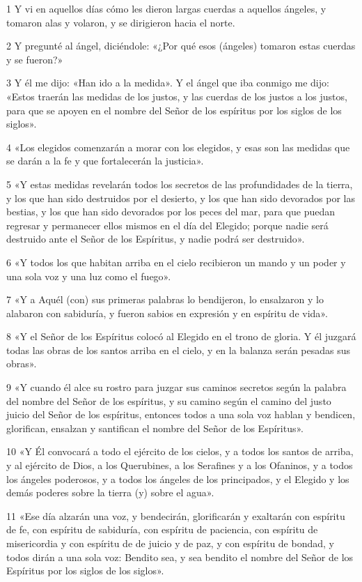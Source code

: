 \par 1 Y vi en aquellos días cómo les dieron largas cuerdas a aquellos ángeles, y tomaron alas y volaron, y se dirigieron hacia el norte.
\par 2 Y pregunté al ángel, diciéndole: «¿Por qué esos (ángeles) tomaron estas cuerdas y se fueron?»
\par 3 Y él me dijo: «Han ido a la medida». Y el ángel que iba conmigo me dijo: «Estos traerán las medidas de los justos, y las cuerdas de los justos a los justos, para que se apoyen en el nombre del Señor de los espíritus por los siglos de los siglos».
\par 4 «Los elegidos comenzarán a morar con los elegidos, y esas son las medidas que se darán a la fe y que fortalecerán la justicia».
\par 5 «Y estas medidas revelarán todos los secretos de las profundidades de la tierra, y los que han sido destruidos por el desierto, y los que han sido devorados por las bestias, y los que han sido devorados por los peces del mar, para que puedan regresar y permanecer ellos mismos en el día del Elegido; porque nadie será destruido ante el Señor de los Espíritus, y nadie podrá ser destruido».
\par 6 «Y todos los que habitan arriba en el cielo recibieron un mando y un poder y una sola voz y una luz como el fuego».
\par 7 «Y a Aquél (con) sus primeras palabras lo bendijeron, lo ensalzaron y lo alabaron con sabiduría, y fueron sabios en expresión y en espíritu de vida».
\par 8 «Y el Señor de los Espíritus colocó al Elegido en el trono de gloria. Y él juzgará todas las obras de los santos arriba en el cielo, y en la balanza serán pesadas sus obras».
\par 9 «Y cuando él alce su rostro para juzgar sus caminos secretos según la palabra del nombre del Señor de los espíritus, y su camino según el camino del justo juicio del Señor de los espíritus, entonces todos a una sola voz hablan y bendicen, glorifican, ensalzan y santifican el nombre del Señor de los Espíritus».
\par 10 «Y Él convocará a todo el ejército de los cielos, y a todos los santos de arriba, y al ejército de Dios, a los Querubines, a los Serafines y a los Ofaninos, y a todos los ángeles poderosos, y a todos los ángeles de los principados, y el Elegido y los demás poderes sobre la tierra (y) sobre el agua».
\par 11 «Ese día alzarán una voz, y bendecirán, glorificarán y exaltarán con espíritu de fe, con espíritu de sabiduría, con espíritu de paciencia, con espíritu de misericordia y con espíritu de de juicio y de paz, y con espíritu de bondad, y todos dirán a una sola voz: Bendito sea, y sea bendito el nombre del Señor de los Espíritus por los siglos de los siglos».
